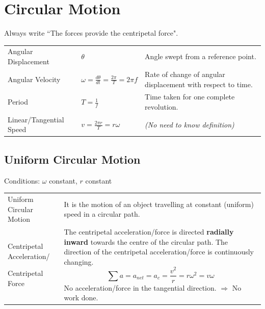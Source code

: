 \documentclass[a4paper,11pt]{article}
\begin{document}
	\section{Circular Motion}
		Always write ``The \underline{\hspace{1.5cm}} forces provide the centripetal force".
		\begin{center}
			\renewcommand{\arraystretch}{1.5}
			\begin{tabular}{@{} l l p{7cm} @{}}
				\toprule
				Angular Displacement & $\theta$ & Angle swept from a reference point. \\
				Angular Velocity & $\displaystyle \omega=\frac{d\theta}{dt}=\frac{2\pi}{T}=2\pi f$ & Rate of change of angular displacement with respect to time. \\
				Period & $\displaystyle T=\frac{1}{f}$ & Time taken for one complete revolution. \vspace{\baselineskip}\\
				Linear/Tangential Speed & $\displaystyle v=\frac{2\pi r}{T}=r\omega$ & \textit{(No need to know definition)}\vspace{\baselineskip}\\
				\bottomrule
			\end{tabular}
		\end{center}
		\subsection{Uniform Circular Motion}
			Conditions: $\omega$ constant, $r$ constant
			\begin{center}
				\renewcommand{\arraystretch}{1.5}
				\begin{tabular}{@{} p{4cm} p{10.6cm} @{}}
					\toprule
					Uniform Circular Motion & It is the motion of an object travelling at constant (uniform) speed in a circular path. \\
					Centripetal Acceleration/ \par Centripetal Force& The centripetal acceleration/force is directed \textbf{radially inward} towards the centre of the circular path. The direction of the centripetal acceleration/force is continuously changing. $$\sum a = a_{net} = a_c=\frac{v^2}{r}=r\omega^2=v\omega$$ No acceleration/force in the tangential direction. $\Rightarrow$ No work done. 
					\\
					\bottomrule
				\end{tabular}
			\end{center}
	\newpage
\end{document}
